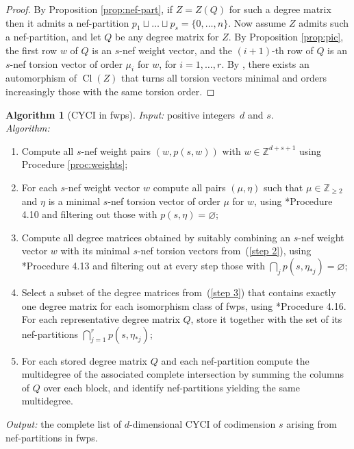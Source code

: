 \documentclass{amsart}
\DeclareMathOperator{\Cl}{Cl}
\newcommand{\Z}{\mathbb{Z}}
\theoremstyle{definition}
\newtheorem{algorithm}[lem]{Algorithm}
\begin{document}
\begin{proof}
    By Proposition \ref{prop:nef-part}, if $Z=Z(Q)$ for such a degree matrix then it admits a nef-partition $p_1\sqcup\dots\sqcup p_s=\{0,\dots,n\}$.
    Now assume $Z$ admits such a nef-partition, and let $Q$ be any degree matrix for $Z$. By Proposition \ref{prop:pic}, the first row $w$ of $Q$ is an $s$-nef weight vector, and the $(i+1)$-th row of $Q$ is an $s$-nef torsion vector of order $\mu_i$ for $w$, for $i=1,\dots,r$. By \cite[Theorem 2.1]{Ghi}, there exists an automorphism of $\Cl(Z)$ that turns all torsion vectors minimal and orders increasingly those with the same torsion order.
\end{proof}

\begin{algorithm}[CYCI in fwps]\label{algo:classification}
\emph{Input:} positive integers~$d$ and $s$. \\
\emph{Algorithm:}
\begin{enumerate}
  \item\label{step 1} Compute all $s$-nef weight pairs $(w,p(s,w))$ with $w\in\Z^{d+s+1}$ using Procedure \ref{proc:weights};
  \item\label{step 2} For each $s$-nef weight vector $w$ compute all pairs $(\mu,\eta)$ such that $\mu\in\Z_{\ge 2}$ and $\eta$ is a minimal $s$-nef torsion vector of order $\mu$ for $w$, using \cite{Ghi}*{Procedure 4.10} and filtering out those with $p(s,\eta)=\varnothing$;
  \item\label{step 3} Compute all degree matrices obtained by suitably combining an $s$-nef weight vector $w$ with its minimal $s$-nef torsion vectors from~(\ref{step 2}), using \cite{Ghi}*{Procedure 4.13} and filtering out at every step those with $\bigcap_{j}p(s,\eta_{\ast j})=\varnothing$;
  \item\label{step 4} Select a subset of the degree matrices from~(\ref{step 3}) that contains exactly one degree matrix for each isomorphism class of fwps, using \cite{Ghi}*{Procedure 4.16}. For each representative degree matrix $Q$, store it together with the set of its nef-partitions $\bigcap_{j=1}^r p(s,\eta_{\ast j})$;
  \item\label{step 5} For each stored degree matrix $Q$ and each nef-partition compute the multidegree of the associated complete intersection by summing the columns of $Q$ over each block, and identify nef-partitions yielding the same multidegree.
\end{enumerate}
\emph{Output:} the complete list of $d$-dimensional CYCI of codimension $s$ arising from nef-partitions in fwps.
\end{algorithm}
\end{document}
